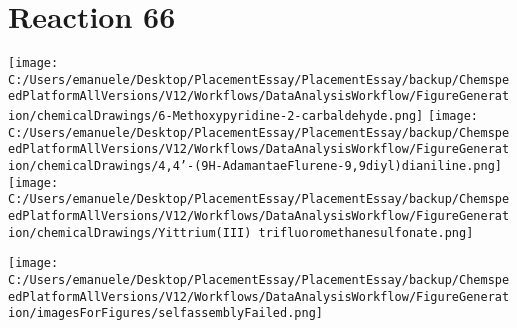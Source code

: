 \documentclass{article}%
\begin{document}
\section*{Reaction 66}%
%
\begin{scheme}[H]%
\begin{minipage}{0.5\textwidth}%
\texttt{[image: C:/Users/emanuele/Desktop/PlacementEssay/PlacementEssay/backup/ChemspeedPlatformAllVersions/V12/Workflows/DataAnalysisWorkflow/FigureGeneration/chemicalDrawings/6-Methoxypyridine-2-carbaldehyde.png]}%
\texttt{[image: C:/Users/emanuele/Desktop/PlacementEssay/PlacementEssay/backup/ChemspeedPlatformAllVersions/V12/Workflows/DataAnalysisWorkflow/FigureGeneration/chemicalDrawings/4,4'-(9H-AdamantaeFlurene-9,9diyl)dianiline.png]}%
\texttt{[image: C:/Users/emanuele/Desktop/PlacementEssay/PlacementEssay/backup/ChemspeedPlatformAllVersions/V12/Workflows/DataAnalysisWorkflow/FigureGeneration/chemicalDrawings/Yittrium(III) trifluoromethanesulfonate.png]}%
\end{minipage}%
\begin{minipage}{0.5\textwidth}%
\begin{center}%
\texttt{[image: C:/Users/emanuele/Desktop/PlacementEssay/PlacementEssay/backup/ChemspeedPlatformAllVersions/V12/Workflows/DataAnalysisWorkflow/FigureGeneration/imagesForFigures/selfassemblyFailed.png]}%
\end{center}%
\end{minipage}%
\caption{Self-assembly of components 6, 13, with Yittrium(III) in a 3.0:1.5:1.0 molar ratio in CH$_3$CN at 60\textdegree C for 40h. These are the reagents (starting materials) for reaction 66.}%
\end{scheme}%
\end{document}
